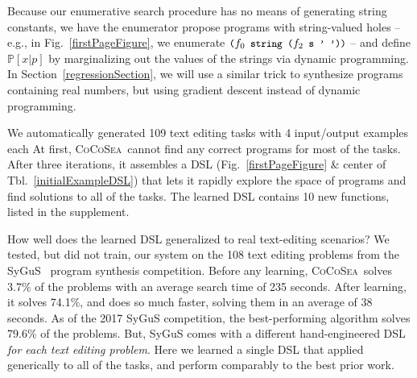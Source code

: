 \documentclass{article}
\newcommand{\system}{\textsc{CoCoSea}~}
\newcommand{\code}[1]{{\footnotesize\texttt{#1}}}
\newcommand{\probability}{\mathds{P}} %
\begin{document}
Because our enumerative search procedure has no means of generating
string constants, we have the enumerator propose programs with string-valued holes --
e.g., in Fig.~\ref{firstPageFigure},
we enumerate $\text{\code{(}}f_0\code{ string (}f_2\text{\code{ s ' '))}}$ --
and define $\probability[x|p]$ by marginalizing out the values of the
strings via dynamic programming.  In Section~\ref{regressionSection},
we will use a similar trick to synthesize programs containing real
numbers, but using gradient descent instead of dynamic programming.

We automatically generated 109 text editing tasks with 4 input/output examples each
At first, \system cannot find any correct programs for most of the tasks.
After three iterations, it assembles a DSL (Fig.~\ref{firstPageFigure} \& center of Tbl.~\ref{initialExampleDSL}) that lets it rapidly explore the space of programs and find solutions to
all of the tasks. The learned DSL contains 10 new functions, listed in the supplement.

How well does the  learned DSL generalized to real text-editing scenarios?
We tested, but did not train, our system on the 108 text editing problems from the SyGuS~\cite{alur2016sygus} program synthesis competition. Before any learning,
\system solves 3.7\% of the problems with an average search time of 235 seconds.
After learning,
it solves 74.1\%, and does so much faster,
solving them in an average of 38 seconds.
As of the 2017 SyGuS competition,
the best-performing algorithm solves 79.6\% of the problems.
But, SyGuS comes with a
different hand-engineered DSL \emph{for each text editing problem}.
Here  we learned a single DSL
that applied generically to
all of the tasks,
and perform comparably to the best
prior work.
\end{document}
